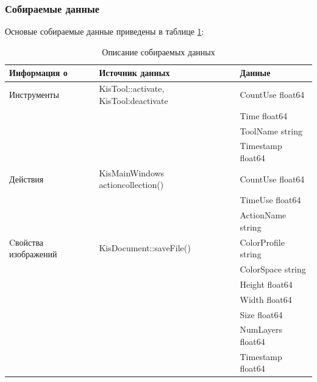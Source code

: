 \subsubsection{Собираемые данные}
Основые собираемые данные приведены в таблице \ref{tab:collectdata}:

\begin{table}[!h]

\caption{\label{tab:collectdata}Описание собираемых данных}

\begin{center}

\begin{tabular}{|l|l|l|}

\hline

Информация о & Источник данных & Данные \\

\hline \hline

Инструменты & KisTool::activate, KisTool:deactivate & 

CountUse float64 

\tabularnewline & & Time     float64 

\tabularnewline & & ToolName string 

\tabularnewline & & Timestamp     float64 \\


\hline

Действия & 

KisMainWindows actioncollection()

& 

CountUse float64 

\tabularnewline & & TimeUse      float64 

\tabularnewline & & ActionName string \\


\hline

Cвойства изображений & 

KisDocument::saveFile()

& 

ColorProfile string 

\tabularnewline & &  ColorSpace   string 

\tabularnewline & & Height       float64 

\tabularnewline & & Width      float64

\tabularnewline & & Size      float64 

\tabularnewline & & NumLayers      float64 

\tabularnewline & & Timestamp     float64 \\



\end{tabular}
\end{center}
\end{table}
